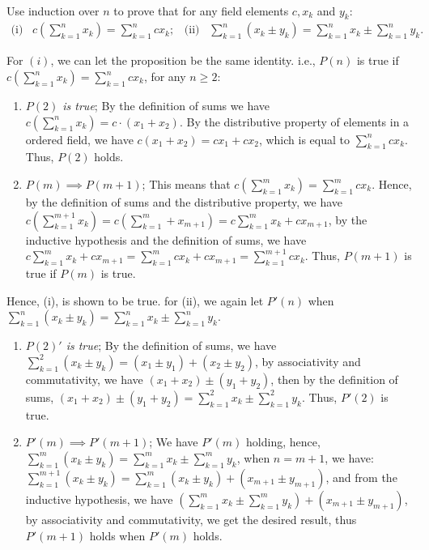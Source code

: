 \documentclass[12pt]{book}
\theoremstyle{definition}
\begin{document}
\begin{ex}[5]
\\
Use induction over $n$ to prove that for any field elements $c, x_k$ and $y_k$:
\begin{align*}
	\text{(i)}\;\;\; c\left(\sum_{k=1}^n x_k \right) = \sum_{k=1}^n cx_k;\;\;\; \text{(ii)}\;\;\; \sum_{k=1}^n (x_k\pm y_k) = \sum_{k=1}^n x_k \pm \sum_{k=1}^n y_k.   
\end{align*}
\end{ex}
\begin{sol}
For $(i)$, we can let the proposition be the same identity. i.e., $P(n)$ is true if $c(\sum_{k=1}^n x_k ) = \sum_{k=1}^n cx_k$, for any $n \geq 2$:
\begin{enumerate}[label=(\roman*)]
	\item \textit{$P(2)$ is true}; By the definition of sums we have $c(\sum_{k=1}^n x_k ) = c\cdot( x_1 +x_2)$. By the distributive property of elements in a ordered field, we have $c(x_1+x_2)=cx_1+cx_2$, which is equal to $\sum_{k=1}^n cx_k$. Thus, $P(2)$ holds.
	\item $P(m)\implies P(m+1)$; This means that $c(\sum_{k=1}^m x_k ) = \sum_{k=1}^m cx_k$. Hence, by the definition of sums and the distributive property, we have $c(\sum_{k=1}^{m+1} x_k )= c(\sum_{k=1}^{m} +x_{m+1})= c\sum_{k=1}^{m}x_k + cx_{m+1}$, by the inductive hypothesis and the definition of sums, we have $c\sum_{k=1}^{m}x_k + cx_{m+1} = \sum_{k=1}^{m}cx_k + cx_{m+1} = \sum_{k=1}^{m+1}cx_k$. Thus, $P(m+1)$ is true if $P(m)$ is true.  
\end{enumerate}
Hence, (i), is shown to be true. for (ii), we again let $P'(n)$ when $\sum_{k=1}^n (x_k\pm y_k) = \sum_{k=1}^n x_k \pm \sum_{k=1}^n y_k$.
\begin{enumerate}[label=(\roman*)$'$]
	\item \textit{$P(2)'$ is true}; By the definition of sums, we have $\sum_{k=1}^2 (x_k\pm y_k)=(x_1\pm y_1)+(x_2\pm y_2)$, by associativity and commutativity, we have $(x_1+x_2)\pm (y_1+y_2)$, then by the definition of sums, $(x_1+x_2)\pm (y_1+y_2)= \sum_{k=1}^2 x_k \pm \sum_{k=1}^2 y_k$. Thus, $P'(2)$ is true.
	\item $P'(m)\implies P'(m+1)$; We have $P'(m)$ holding, hence, $\sum_{k=1}^m (x_k\pm y_k) = \sum_{k=1}^m x_k \pm \sum_{k=1}^m y_k$, when $n=m+1$, we have: $\sum_{k=1}^{m+1} (x_k\pm y_k)= \sum_{k=1}^m (x_k\pm y_k)+ (x_{m+1}\pm y_{m+1})$, and from the inductive hypothesis, we have $(\sum_{k=1}^m x_k \pm \sum_{k=1}^m y_k)+(x_{m+1}\pm y_{m+1})$, by associativity and commutativity, we get the desired result, thus $P'(m+1)$ holds when $P'(m)$ holds.  
\end{enumerate}	
\end{sol}
\end{document}
